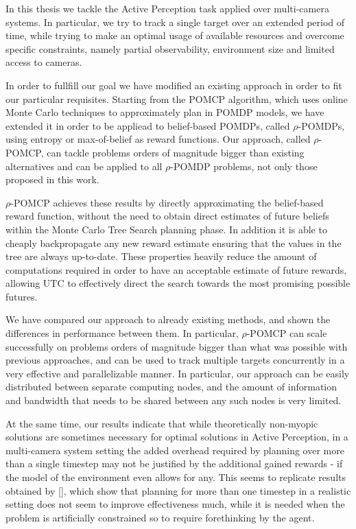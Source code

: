 In this thesis we tackle the Active Perception task applied over multi-camera systems. In
particular, we try to track a single target over an extended period of time, while trying to make an
optimal usage of available resources and overcome specific constraints, namely partial
observability, environment size and limited access to cameras.

In order to fullfill our goal we have modified an existing approach in order to fit our particular
requisites. Starting from the POMCP algorithm, which uses online Monte Carlo techniques to
approximately plan in POMDP models, we have extended it in order to be appliead to belief-based
POMDPs, called $\rho$-POMDPs, using entropy or max-of-belief as reward functions. Our approach,
called $\rho$-POMCP, can tackle problems orders of magnitude bigger than existing alternatives and
can be applied to all $\rho$-POMDP problems, not only those proposed in this work.

$\rho$-POMCP achieves these results by directly approximating the belief-based reward function,
without the need to obtain direct estimates of future beliefs within the Monte Carlo Tree Search
planning phase. In addition it is able to cheaply backpropagate any new reward estimate ensuring
that the values in the tree are always up-to-date. These properties heavily reduce the amount of
computations required in order to have an acceptable estimate of future rewards, allowing UTC to
effectively direct the search towards the most promising possible futures.

We have compared our approach to already existing methods, and shown the differences in performance
between them. In particular, $\rho$-POMCP can scale successfully on problems orders of magnitude
bigger than what was possible with previous approaches, and can be used to track multiple targets
concurrently in a very effective and parallelizable manner. In particular, our approach can be
easily distributed between separate computing nodes, and the amount of information and bandwidth
that needs to be shared between any such nodes is very limited.

At the same time, our results indicate that while theoretically non-myopic solutions are sometimes
necessary for optimal solutions in Active Perception, in a multi-camera system setting the added
overhead required by planning over more than a single timestep may not be justified by the
additional gained rewards - if the model of the environment even allows for any. This seems to
replicate results obtained by [], which show that planning for more than one timestep in a realistic
setting does not seem to improve effectiveness much, while it is needed when the problem is
artificially constrained so to require forethinking by the agent.

